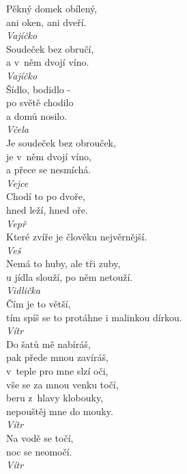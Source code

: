 \begin{multicols}{\value{columnsthindata}}
\noindent
Pěkný domek obílený,\\
ani oken, ani dveří.\\[1 mm]
{\sl Vajíčko}\\

\noindent
Soudeček bez obručí,\\
a v~něm dvojí víno.\\[1 mm]
{\sl Vajíčko}\\

\noindent
Šídlo, bodidlo -\\
po světě chodilo\\
a domů nosilo.\\[1 mm]
{\sl Včela}\\

\noindent
Je soudeček bez obrouček,\\
je v~něm dvojí víno,\\
a přece se nesmíchá.\\[1 mm]
{\sl Vejce}\\

\noindent
Chodí to po dvoře,\\
hned leží, hned oře.\\[1 mm]
{\sl Vepř}\\

\noindent
Které zvíře je člověku nejvěrnější.\\[1 mm]
{\sl Veš}\\

\noindent
Nemá to huby, ale tři zuby,\\
u jídla slouží, po něm netouží.\\[1 mm]
{\sl Vidlička}\\

\noindent
Čím je to větší,\\
tím spíš se to protáhne i malinkou dírkou.\\[1 mm]
{\sl Vítr}\\

\noindent
Do šatů mě nabíráš,\\
pak přede mnou zavíráš,\\
v~teple pro mne slzí oči,\\
vše se za mnou venku točí,\\
beru z~hlavy klobouky,\\
nepouštěj mne do mouky.\\[1 mm]
{\sl Vítr}\\

\noindent
Na vodě se točí,\\
noc se neomočí.\\[1 mm]
{\sl Vítr}\\


\end{multicols}

